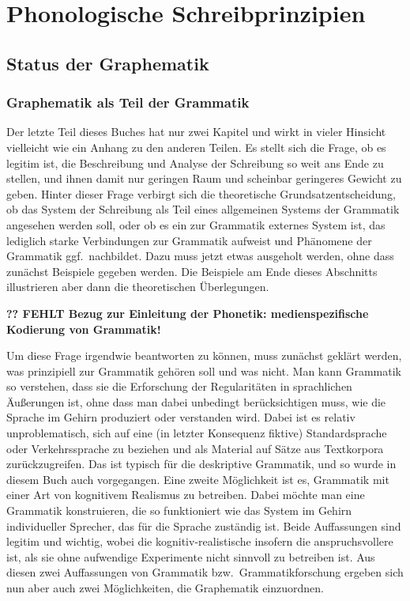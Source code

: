 \chapter{Phonologische Schreibprinzipien}

\label{sec:phonschrift}

\section{Status der Graphematik}

\subsection{Graphematik als Teil der Grammatik}

\label{sec:graphegrammatik}

Der letzte Teil dieses Buches hat nur zwei Kapitel und wirkt in vieler Hinsicht vielleicht wie ein Anhang zu den anderen Teilen.
Es stellt sich die Frage, ob es legitim ist, die Beschreibung und Analyse der Schreibung so weit ans Ende zu stellen, und ihnen damit nur geringen Raum und scheinbar geringeres Gewicht zu geben.
Hinter dieser Frage verbirgt sich die theoretische Grundsatzentscheidung, ob das System der Schreibung als Teil eines allgemeinen Systems der Grammatik angesehen werden soll, oder ob es ein zur Grammatik externes System ist, das lediglich starke Verbindungen zur Grammatik aufweist und Phänomene der Grammatik ggf.\ nachbildet.
Dazu muss jetzt etwas ausgeholt werden, ohne dass zunächst Beispiele gegeben werden.
Die Beispiele am Ende dieses Abschnitts illustrieren aber dann die theoretischen Überlegungen.

\textbf{?? FEHLT Bezug zur Einleitung der Phonetik: medienspezifische Kodierung von Grammatik!}

Um diese Frage irgendwie beantworten zu können, muss zunächst geklärt werden, was prinzipiell zur Grammatik gehören soll und was nicht.
Man kann Grammatik so verstehen, dass sie die Erforschung der Regularitäten in sprachlichen Äußerungen ist, ohne dass man dabei unbedingt berücksichtigen muss, wie die Sprache im Gehirn produziert oder verstanden wird.
Dabei ist es relativ unproblematisch, sich auf eine (in letzter Konsequenz fiktive) Standardsprache oder Verkehrssprache zu beziehen und als Material auf Sätze aus Textkorpora zurückzugreifen.
Das ist typisch für die deskriptive Grammatik, und so wurde in diesem Buch auch vorgegangen.
Eine zweite Möglichkeit ist es, Grammatik mit einer Art von kognitivem Realismus zu betreiben.
Dabei möchte man eine Grammatik konstruieren, die so funktioniert wie das System im Gehirn individueller Sprecher, das für die Sprache zuständig ist.
Beide Auffassungen sind legitim und wichtig, wobei die kognitiv-realistische insofern die anspruchsvollere ist, als sie ohne aufwendige Experimente nicht sinnvoll zu betreiben ist.
Aus diesen zwei Auffassungen von Grammatik bzw.\ Grammatikforschung ergeben sich nun aber auch zwei Möglichkeiten, die Graphematik einzuordnen.

